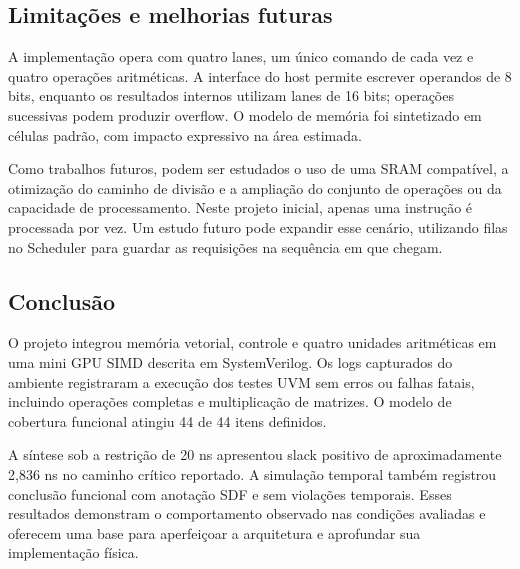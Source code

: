 \documentclass[10pt,a4paper]{article}
\begin{document}
\subsection{Limitações e melhorias futuras}
A implementação opera com quatro lanes, um único comando de cada vez e quatro operações aritméticas. A interface do host permite escrever operandos de 8 bits, enquanto os resultados internos utilizam lanes de 16 bits; operações sucessivas podem produzir overflow. O modelo de memória foi sintetizado em células padrão, com impacto expressivo na área estimada.

Como trabalhos futuros, podem ser estudados o uso de uma SRAM compatível, a otimização do caminho de divisão e a ampliação do conjunto de operações ou da capacidade de processamento. Neste projeto inicial, apenas uma instrução é processada por vez. Um estudo futuro pode expandir esse cenário, utilizando filas no Scheduler para guardar as requisições na sequência em que chegam.

\subsection{Conclusão}
O projeto integrou memória vetorial, controle e quatro unidades aritméticas em uma mini GPU SIMD descrita em SystemVerilog. Os logs capturados do ambiente registraram a execução dos testes UVM sem erros ou falhas fatais, incluindo operações completas e multiplicação de matrizes. O modelo de cobertura funcional atingiu 44 de 44 itens definidos.

A síntese sob a restrição de 20 ns apresentou slack positivo de aproximadamente 2,836 ns no caminho crítico reportado. A simulação temporal também registrou conclusão funcional com anotação SDF e sem violações temporais. Esses resultados demonstram o comportamento observado nas condições avaliadas e oferecem uma base para aperfeiçoar a arquitetura e aprofundar sua implementação física.
\end{document}
